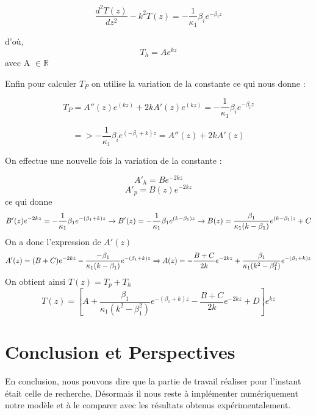 \documentclass{rapportECC}
\begin{document}
\begin{equation*}
    \frac{d^2 T(z)}{d z^2} - k^2 T(z) = - \frac{1}{\kappa_1}\beta_i e^{-\beta_iz}
\end{equation*}

d'où,
\begin{equation}
    T_h = A e^{kz} 
\end{equation}
avec A $\in \mathbb{R}$

Enfin pour calculer $T_P$ on utilise la variation de la constante ce qui nous donne :

\begin{equation*}
            T_P = A''(z)e^{(kz)} + 2k A'(z)e^{(kz)} = - \frac{1}{\kappa_1}\beta_i e^{-\beta_iz} 
\end{equation*}

\begin{equation*}
            => - \frac{1}{\kappa_1}\beta_i e^{(-\beta_i + k)z} = A''(z) + 2k A'(z)
\end{equation*}

On effectue une nouvelle fois la variation de la constante :

\begin{equation*}
    A'_h = B e^{-2kz}
\end{equation*}
\begin{equation*}
    A'_p = B(z) e^{-2kz}
\end{equation*}
ce qui donne
\begin{equation*}
   B'(z)e^{-2kz} = -\frac{1}{\kappa_1}\beta_1 e^{-(\beta_1+k)z}\\
   \xrightarrow{} B'(z) = -\frac{1}{\kappa_1}\beta_1 e^{(k-\beta_1)z}
   \xrightarrow{} B(z) = \frac{\beta_1}{\kappa_1(k-\beta_1)}e^{(k-\beta_1)z} + C
\end{equation*}
On a donc l'expression de $A'(z)$
\begin{equation*}
   A'(z)=(B+C)e^{-2kz} -\frac{-\beta_1}{\kappa_1(k-\beta_1)} e^{-(\beta_1+k)z}\\
   \xrightarrow{} A(z) = -\frac{B+C}{2k}e^{-2kz}+\frac{\beta_1}{\kappa_1(k^2-\beta_1^2)} e^{-(\beta_1+k)z}
\end{equation*}
On obtient ainsi $T(z) = T_p + T_h$
\begin{equation}
            T(z) = \left[A+\frac{\beta_1}{\kappa_1(k^2-\beta_1^2)}e^{-(\beta_1+k)z}-\frac{B+C}{2k}e^{-2kz}+D\right]e^{kz} 
\end{equation}


\section{Conclusion et Perspectives}

En conclusion, nous pouvons dire que la partie de travail réaliser pour l’instant était celle de recherche. Désormais il nous reste à implémenter numériquement notre modèle et à le comparer avec les résultats obtenus expérimentalement.

\newpage


\printbibliography
\end{document}

